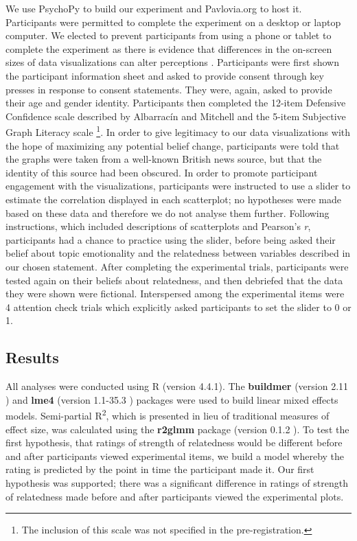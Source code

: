 \documentclass[manuscript,screen,review]{acmart}
\begin{document}
We use PsychoPy \citep{pierce_2019} to build our experiment and
Pavlovia.org to host it. Participants were permitted to complete the
experiment on a desktop or laptop computer. We elected to prevent
participants from using a phone or tablet to complete the experiment as
there is evidence that differences in the on-screen sizes of data
visualizations can alter perceptions \citep{cleveland_1982}.
Participants were first shown the participant information sheet and
asked to provide consent through key presses in response to consent
statements. They were, again, asked to provide their age and gender
identity. Participants then completed the 12-item Defensive Confidence
scale described by Albarracín and Mitchell \citep{albarracin_2004} and
the 5-item Subjective Graph Literacy scale \citep{garcia_2016}
\footnote{The inclusion of this scale was not specified in the
  pre-registration.}. In order to give legitimacy to our data
visualizations with the hope of maximizing any potential belief change,
participants were told that the graphs were taken from a well-known
British news source, but that the identity of this source had been
obscured. In order to promote participant engagement with the
visualizations, participants were instructed to use a slider to estimate
the correlation displayed in each scatterplot; no hypotheses were made
based on these data and therefore we do not analyse them further.
Following instructions, which included descriptions of scatterplots and
Pearson's \emph{r}, participants had a chance to practice using the
slider, before being asked their belief about topic emotionality and the
relatedness between variables described in our chosen statement. After
completing the experimental trials, participants were tested again on
their beliefs about relatedness, and then debriefed that the data they
were shown were fictional. Interspersed among the experimental items
were 4 attention check trials which explicitly asked participants to set
the slider to 0 or 1.

\subsection{Results}\label{sec-results-main}

All analyses were conducted using R (version 4.4.1). The
\textbf{buildmer} (version 2.11 \citep{buildmer}) and \textbf{lme4}
(version 1.1-35.3 \citep{lme4}) packages were used to build linear mixed
effects models. Semi-partial R\textsuperscript{2}, which is presented in
lieu of traditional measures of effect size, was calculated using the
\textbf{r2glmm} package (version 0.1.2 \citep{r2glmm}). To test the
first hypothesis, that ratings of strength of relatedness would be
different before and after participants viewed experimental items, we
build a model whereby the rating is predicted by the point in time the
participant made it. Our first hypothesis was supported; there was a
significant difference in ratings of strength of relatedness made before
and after participants viewed the experimental plots.
\end{document}
